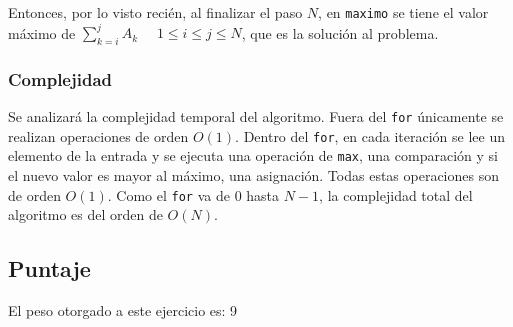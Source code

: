 Entonces, por lo visto recién, al finalizar el paso $N$, en \texttt{maximo} se tiene el valor máximo de $\sum_{k=i}^{j} A_k$            $ \quad 1\leq i\leq j\leq N$, que es la solución al problema.

\subsubsection{Complejidad}
Se analizará la complejidad temporal del algoritmo.
Fuera del \texttt{for} únicamente se realizan operaciones de orden $O(1)$. Dentro del \texttt{for}, en cada iteración se lee un elemento de la entrada y se ejecuta una operación de \texttt{max}, una comparación y si el nuevo valor es mayor al máximo, una asignación. Todas estas operaciones son de orden $O(1)$.
Como el \texttt{for} va de $0$ hasta $N-1$, la complejidad total del algoritmo es del orden de $O(N)$.

\subsection{Puntaje}
El peso otorgado a este ejercicio es: 9